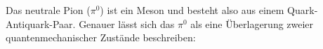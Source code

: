 Das neutrale Pion ($\pi^{0}$) ist ein Meson und besteht also aus einem Quark-Antiquark-Paar. Genauer l\"asst sich das $\pi^{0}$ als eine \"Uberlagerung zweier quantenmechanischer Zust\"ande beschreiben:
